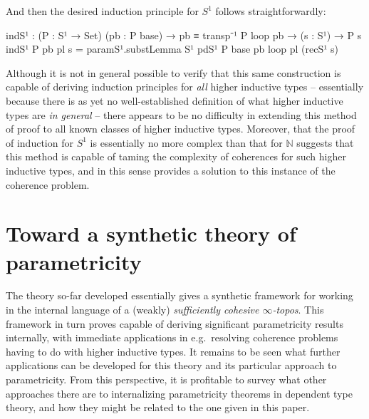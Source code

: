 \documentclass[
  12pt]{article}
\newenvironment{Shaded}{\begin{snugshade}}{\end{snugshade}}
\newcommand{\DataTypeTok}[1]{\textcolor[rgb]{0.00,0.34,0.68}{#1}}
\newcommand{\NormalTok}[1]{\textcolor[rgb]{0.12,0.11,0.11}{#1}}
\newcommand{\OtherTok}[1]{\textcolor[rgb]{0.00,0.43,0.16}{#1}}
\begin{document}
And then the desired induction principle for \(S^1\) follows
straightforwardly:

\begin{Shaded}
\begin{Highlighting}[]
\NormalTok{indS¹ }\OtherTok{:} \OtherTok{(}\NormalTok{P }\OtherTok{:}\NormalTok{ S¹ }\OtherTok{→} \DataTypeTok{Set}\OtherTok{)} \OtherTok{(}\NormalTok{pb }\OtherTok{:}\NormalTok{ P base}\OtherTok{)} \OtherTok{→}\NormalTok{ pb ≡ transp⁻¹ P loop pb }\OtherTok{→} \OtherTok{(}\NormalTok{s }\OtherTok{:}\NormalTok{ S¹}\OtherTok{)} \OtherTok{→}\NormalTok{ P s}
\NormalTok{indS¹ P pb pl s }\OtherTok{=}\NormalTok{ paramS¹}\OtherTok{.}\NormalTok{substLemma S¹ pdS¹ P base pb loop pl }\OtherTok{(}\NormalTok{recS¹ s}\OtherTok{)}
\end{Highlighting}
\end{Shaded}

Although it is not in general possible to verify that this same
construction is capable of deriving induction principles for \emph{all}
higher inductive types -- essentially because there is as yet no
well-established definition of what higher inductive types are \emph{in
general} -- there appears to be no difficulty in extending this method
of proof to all known classes of higher inductive types. Moreover, that
the proof of induction for \(S^1\) is essentially no more complex than
that for \(\mathbb{N}\) suggests that this method is capable of taming
the complexity of coherences for such higher inductive types, and in
this sense provides a solution to this instance of the coherence
problem.

\section{Toward a synthetic theory of
parametricity}\label{toward-a-synthetic-theory-of-parametricity}

The theory so-far developed essentially gives a synthetic framework for
working in the internal language of a (weakly) \emph{sufficiently
cohesive \(\infty\)-topos}. This framework in turn proves capable of
deriving significant parametricity results internally, with immediate
applications in e.g.~resolving coherence problems having to do with
higher inductive types. It remains to be seen what further applications
can be developed for this theory and its particular approach to
parametricity. From this perspective, it is profitable to survey what
other approaches there are to internalizing parametricity theorems in
dependent type theory, and how they might be related to the one given in
this paper.
\end{document}
